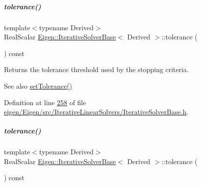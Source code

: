 \mbox{\label{group___iterative_linear_solvers___module_acb442c19b5858d6b9be813dd7d36cc62}} 
\subparagraph{\texorpdfstring{tolerance()}{tolerance()}\hspace{0.1cm}{\footnotesize\ttfamily [1/2]}}
{\footnotesize\ttfamily template$<$typename Derived$>$ \\
Real\+Scalar \hyperlink{group___iterative_linear_solvers___module_class_eigen_1_1_iterative_solver_base}{Eigen\+::\+Iterative\+Solver\+Base}$<$ Derived $>$\+::tolerance (\begin{DoxyParamCaption}{ }\end{DoxyParamCaption}) const\hspace{0.3cm}{\ttfamily [inline]}}

\begin{DoxyReturn}{Returns}
the tolerance threshold used by the stopping criteria. 
\end{DoxyReturn}
\begin{DoxySeeAlso}{See also}
\hyperlink{group___iterative_linear_solvers___module_ac160a444af8998f93da9aa30e858470d}{set\+Tolerance()} 
\end{DoxySeeAlso}


Definition at line \hyperlink{eigen_2_eigen_2src_2_iterative_linear_solvers_2_iterative_solver_base_8h_source_l00258}{258} of file \hyperlink{eigen_2_eigen_2src_2_iterative_linear_solvers_2_iterative_solver_base_8h_source}{eigen/\+Eigen/src/\+Iterative\+Linear\+Solvers/\+Iterative\+Solver\+Base.\+h}.

\mbox{\label{group___iterative_linear_solvers___module_acb442c19b5858d6b9be813dd7d36cc62}} 
\subparagraph{\texorpdfstring{tolerance()}{tolerance()}\hspace{0.1cm}{\footnotesize\ttfamily [2/2]}}
{\footnotesize\ttfamily template$<$typename Derived$>$ \\
Real\+Scalar \hyperlink{group___iterative_linear_solvers___module_class_eigen_1_1_iterative_solver_base}{Eigen\+::\+Iterative\+Solver\+Base}$<$ Derived $>$\+::tolerance (\begin{DoxyParamCaption}{ }\end{DoxyParamCaption}) const\hspace{0.3cm}{\ttfamily [inline]}}

